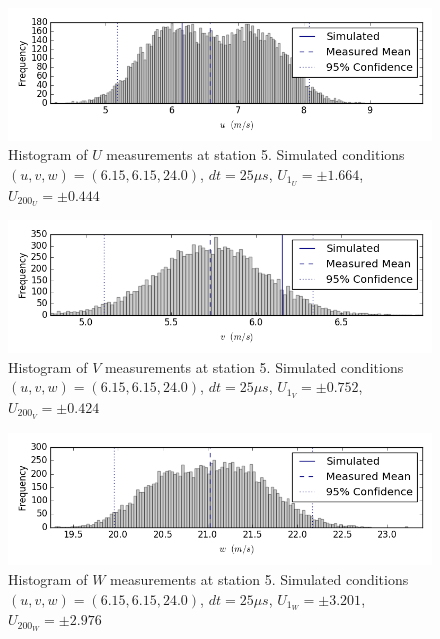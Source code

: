 \begin{figure}[H]
\centering
\includegraphics[width=6in]{figs/Ely_May28th05001/uncertainty_Ely_May28th05001_U}
\caption{Histogram of $U$ measurements at station 5. Simulated conditions $(u,v,w)=(6.15, 6.15, 24.0)$, $dt=25 \mu s$, $U_1_U=\pm 1.664$, $U_200_U=\pm 0.444$}
\label{fig:uncertainty_Ely_May28th05001_U}
\end{figure}


\begin{figure}[H]
\centering
\includegraphics[width=6in]{figs/Ely_May28th05001/uncertainty_Ely_May28th05001_V}
\caption{Histogram of $V$ measurements at station 5. Simulated conditions $(u,v,w)=(6.15, 6.15, 24.0)$, $dt=25 \mu s$, $U_1_V=\pm 0.752$, $U_200_V=\pm 0.424$}
\label{fig:uncertainty_Ely_May28th05001_V}
\end{figure}


\begin{figure}[H]
\centering
\includegraphics[width=6in]{figs/Ely_May28th05001/uncertainty_Ely_May28th05001_W}
\caption{Histogram of $W$ measurements at station 5. Simulated conditions $(u,v,w)=(6.15, 6.15, 24.0)$, $dt=25 \mu s$, $U_1_W=\pm 3.201$, $U_200_W=\pm 2.976$}
\label{fig:uncertainty_Ely_May28th05001_W}
\end{figure}


